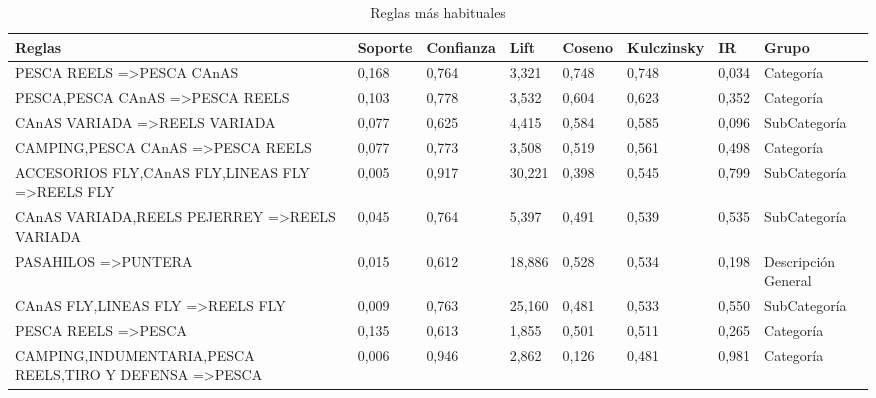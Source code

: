 \documentclass[]{article}
\begin{document}
	\begin{landscape}
		
		\begin{table}[]
			\centering
			\caption{Reglas más habituales}
			\label{Tab_Reg_Habituales}%
			\begin{tabular}{llllllll}
				{\bf Reglas}                                                                         & {\bf Soporte} & {\bf Confianza} & {\bf Lift} & {\bf Coseno} & {\bf Kulczinsky} & {\bf IR} & {\bf Grupo} \\
				\hline
				PESCA REELS =\textgreater PESCA CAnAS                               & 0,168   & 0,764 & 3,321  & 0,748  & 0,748  & 0,034 & Categoría           \\
				PESCA,PESCA CAnAS =\textgreater PESCA REELS                         & 0,103   & 0,778 & 3,532  & 0,604  & 0,623  & 0,352 & Categoría           \\
				CAnAS VARIADA =\textgreater REELS VARIADA                           & 0,077   & 0,625 & 4,415  & 0,584  & 0,585  & 0,096 & SubCategoría        \\
				CAMPING,PESCA CAnAS =\textgreater PESCA REELS                       & 0,077   & 0,773 & 3,508  & 0,519  & 0,561  & 0,498 & Categoría           \\
				ACCESORIOS FLY,CAnAS FLY,LINEAS FLY =\textgreater REELS FLY         & 0,005   & 0,917 & 30,221 & 0,398  & 0,545  & 0,799 & SubCategoría        \\
				CAnAS VARIADA,REELS PEJERREY =\textgreater REELS VARIADA            & 0,045   & 0,764 & 5,397  & 0,491  & 0,539  & 0,535 & SubCategoría        \\
				PASAHILOS =\textgreater PUNTERA                                     & 0,015   & 0,612 & 18,886 & 0,528  & 0,534  & 0,198 & Descripción General \\
				CAnAS FLY,LINEAS FLY =\textgreater REELS FLY                        & 0,009   & 0,763 & 25,160 & 0,481  & 0,533  & 0,550 & SubCategoría        \\
				PESCA REELS =\textgreater PESCA                                     & 0,135   & 0,613 & 1,855  & 0,501  & 0,511  & 0,265 & Categoría           \\
				CAMPING,INDUMENTARIA,PESCA REELS,TIRO Y DEFENSA =\textgreater PESCA & 0,006   & 0,946 & 2,862  & 0,126  & 0,481  & 0,981 & Categoría          
			\end{tabular}
		\end{table}		
		

\end{landscape}
\end{document}
